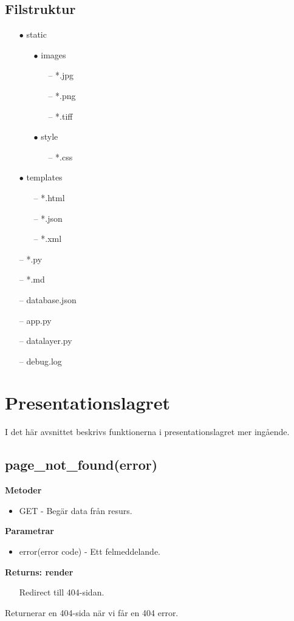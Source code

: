 \documentclass{TDP003mall}
\begin{document}
\subsection{Filstruktur}
\begin{itemize}
    \item[$\bullet$] static
    \begin{itemize}
        \item[$\bullet$] images
        \begin{itemize}
            \item[--] *.jpg
            \item[--] *.png
            \item[--] *.tiff
        \end{itemize}
        \item[$\bullet$] style
        \begin{itemize}
            \item[--] *.css
        \end{itemize}
    \end{itemize}
    \item[$\bullet$] templates
    \begin{itemize}
        \item[--] *.html
        \item[--] *.json
        \item[--] *.xml
    \end{itemize}
    \item[--] *.py
    \item[--] *.md
    \item[--] database.json
    \item[--] app.py
    \item[--] datalayer.py
    \item[--] debug.log
\end{itemize}

\section{Presentationslagret}
I det här avsnittet beskrivs funktionerna i presentationslagret  mer ingående.
\subsection{page\_not\_found(error)}
\textbf{Metoder}
\begin{itemize}
    \item GET - Begär data från resurs.
\end{itemize}
\textbf{Parametrar}
\begin{itemize}
    \item error(error code) - Ett felmeddelande.
\end{itemize}
\textbf{Returns: render}
\begin{itemize}
    \item[] Redirect till 404-sidan.
\end{itemize}
Returnerar en 404-sida när vi får en 404 error.
\end{document}
